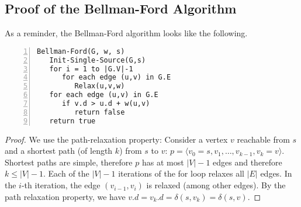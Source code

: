 
\subsection{Proof of the Bellman-Ford Algorithm}

As a reminder, the Bellman-Ford algorithm looks like the following.

\begin{Verbatim}[numbers=left, xleftmargin=5mm]
Bellman-Ford(G, w, s)
   Init-Single-Source(G,s)
   for i = 1 to |G.V|-1
      for each edge (u,v) in G.E
         Relax(u,v,w)
   for each edge (u,v) in G.E
      if v.d > u.d + w(u,v)
         return false
   return true
\end{Verbatim}



\begin{proof} We use the path-relaxation property: Consider a vertex $v$ reachable from $s$ and a shortest path (of length $k$) from $s$ to $v$: $p = \langle v_0 = s, v_1, \ldots, v_{k-1}, v_k = v \rangle$. Shortest paths are simple, therefore $p$ has at most $|V|-1$ edges and therefore $k \leq |V| -1$.  Each of the $|V|-1$ iterations of the for loop relaxes all $|E|$ edges. In the $i$-th iteration, the edge $(v_{i-1},v_i)$ is relaxed (among other edges). By the path relaxation property, we have $v.d = v_k.d = \delta(s, v_k) = \delta(s,v)$.
\end{proof}



